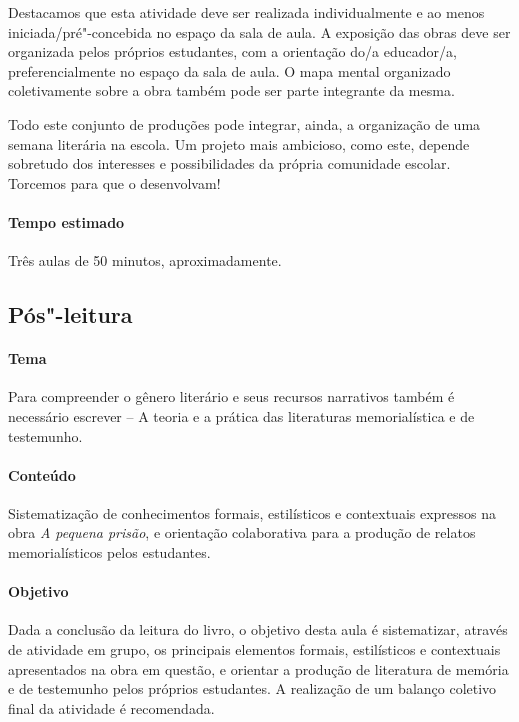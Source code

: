 \documentclass[11pt]{extarticle}
\begin{document}
\begin{enumerate}
Destacamos que esta atividade deve ser realizada individualmente e
ao menos iniciada/pré"-concebida no espaço da sala de aula. A exposição
das obras deve ser organizada pelos próprios estudantes, com a
orientação do/a educador/a, preferencialmente no espaço da sala de aula.
O mapa mental organizado coletivamente sobre a obra também pode ser
parte integrante da mesma. 

Todo este conjunto de produções pode
integrar, ainda, a organização de uma semana literária na escola. Um
projeto mais ambicioso, como este, depende sobretudo dos interesses e
possibilidades da própria comunidade escolar. Torcemos para que o
desenvolvam!
\end{enumerate}



\paragraph{Tempo estimado} Três aulas de 50 minutos, aproximadamente.


\subsection{Pós"-leitura}

\paragraph{Tema} Para compreender o gênero literário e seus recursos
narrativos também é necessário escrever -- A teoria e a prática das
literaturas memorialística e de testemunho.

\paragraph{Conteúdo} Sistematização de conhecimentos formais, estilísticos
e contextuais expressos na obra \emph{A pequena prisão}, e orientação
colaborativa para a produção de relatos memorialísticos pelos
estudantes.

\paragraph{Objetivo} Dada a conclusão da leitura do livro, o objetivo
desta aula é sistematizar, através de atividade em grupo, os principais
elementos formais, estilísticos e contextuais apresentados na obra em
questão, e orientar a produção de literatura de memória e de testemunho
pelos próprios estudantes. A realização de um balanço coletivo final da
atividade é recomendada.
\end{document}
